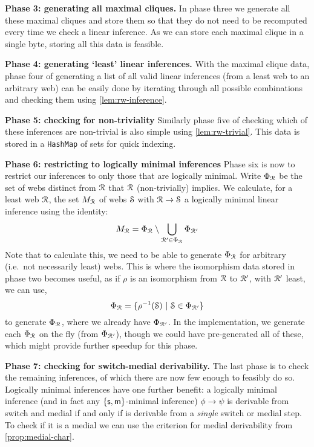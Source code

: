 \documentclass[a4paper, UKenglish, cleveref]{lipics-v2019}
\begin{document}
\textbf{Phase 3: generating all maximal cliques.}
In phase three we generate all these maximal cliques and store them so that they do not need to be recomputed every time we check a linear inference. As we can store each maximal clique in a single byte, storing all this data is feasible.

\textbf{Phase 4: generating `least' linear inferences.}
With the maximal clique data, phase four of generating a list of all valid linear inferences (from a least web to an arbitrary web) can be easily done by iterating through all possible combinations and checking them using \cref{lem:rw-inference}.

\textbf{Phase 5: checking for non-triviality}
Similarly phase five of checking which of these inferences are non-trivial is also simple using \cref{lem:rw-trivial}. This data is stored in a \texttt{HashMap} of sets for quick indexing.

\textbf{Phase 6: restricting to logically minimal inferences}
Phase six is now to restrict our inferences to only those that are logically minimal. Write \(\Phi_\R \) be the set of webs distinct from $\R$ that \(\R \) (non-trivially) implies.
We calculate, for a least web $\R$, the set $M_\R$ of webs $\S$ with $\R \to \S$ a logically minimal linear inference using the identity:
\begin{equation*}
  M_\R = \Phi_\R \setminus \bigcup_{\R' \in \Phi_{\R}} \Phi_{\R'}
\end{equation*}
Note that to calculate this, we need to be able to generate \(\Phi_\R\) for arbitrary (i.e.\ not necessarily least) webs. This is where the isomorphism data stored in phase two becomes useful, as if \(\rho \) is an isomorphism from $\R$ to $\R'$, with \(\R'\) least, we can use,
\begin{equation*}
  \Phi_\R = \{ \rho^{-1}(\S) \ |\  \S \in \Phi_{\R'}\}
\end{equation*}
to generate \(\Phi_\R\), where we already have \(\Phi_{\R'}\). In the implementation, we generate each \(\Phi_\R\) on the fly (from \(\Phi_{\R'}\)), though we could have pre-generated all of these, which might provide further speedup for this phase.

\textbf{Phase 7: checking for switch-medial derivability.}
The last phase is to check the remaining inferences, of which there are now few enough to feasibly do so. Logically minimal inferences have one further benefit: a logically minimal inference (and in fact any \(\{\s,\m\}\)-minimal inference) \(\phi \to \psi\) is derivable from switch and medial if and only if is derivable from a \emph{single} switch or medial step. To check if it is a medial we can use the criterion for medial derivability from \cref{prop:medial-char}.
\end{document}
